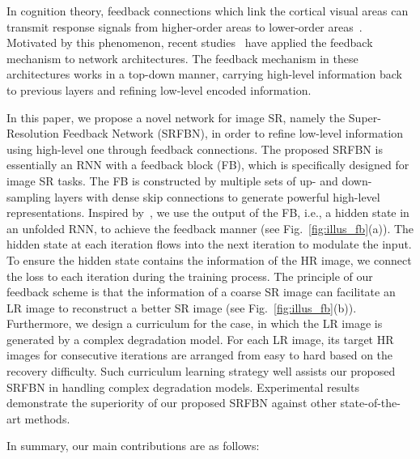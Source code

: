 \documentclass[10pt,twocolumn,letterpaper]{article}
\begin{document}
	In cognition theory, feedback connections which link the cortical visual areas can transmit response signals from higher-order areas to lower-order areas~\cite{Hup1998Cortical, gilbert2007brain}. Motivated by this phenomenon, recent studies~\cite{NIPS2014_5276, Zamir_2017_CVPR} have applied the feedback mechanism to network architectures. The feedback mechanism in these architectures works in a top-down manner, carrying high-level information back to previous layers and refining low-level encoded information.
	
	In this paper, we propose a novel network for image SR, namely the Super-Resolution Feedback Network (SRFBN), in order to refine low-level information using high-level one through feedback connections. The proposed SRFBN is essentially an RNN with a feedback block (FB), which is specifically designed for image SR tasks. The FB is constructed by multiple sets of up- and down-sampling layers with dense skip connections to generate powerful high-level representations. Inspired by~\cite{Zamir_2017_CVPR}, we use the output of the FB, i.e., a hidden state in an unfolded RNN, to achieve the feedback manner (see Fig.~\ref{fig:illus_fb}(a)). The hidden state at each iteration flows into the next iteration to modulate the input. To ensure the hidden state contains the information of the HR image, we connect the loss to each iteration during the training process. The principle of our feedback scheme is that the information of a coarse SR image can facilitate an LR image to reconstruct a better SR image (see Fig.~\ref{fig:illus_fb}(b)). Furthermore, we design a curriculum for the case, in which the LR image is generated by a complex degradation model. For each LR image, its target HR images for consecutive iterations are arranged from easy to hard based on the recovery difficulty. Such curriculum learning strategy well assists our proposed SRFBN in handling complex degradation models. Experimental results demonstrate the superiority of our proposed SRFBN against other state-of-the-art methods.
		
	In summary, our main contributions are as follows:
	
\end{document}
